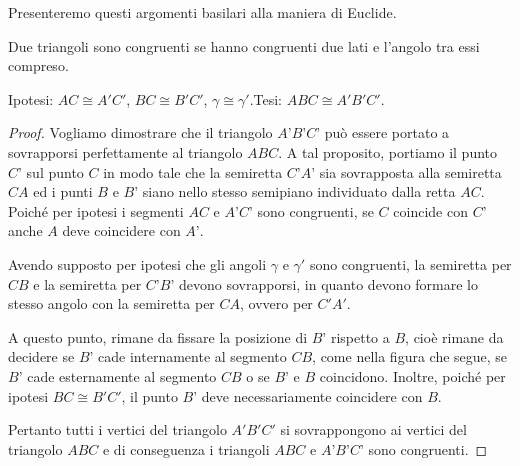 Presenteremo questi argomenti basilari alla maniera di Euclide.

\begin{teorema}
Due triangoli sono congruenti se hanno congruenti due lati e l'angolo 
tra essi compreso.
\end{teorema}


\begin{inaccessibleblock}
 \begin{figure}[htb]
\centering
\end{figure}
\end{inaccessibleblock}

\noindent Ipotesi: \(AC\cong A'C'\), \(BC\cong B'C'\), \(\gamma \cong 
\gamma'\).\tab Tesi:  \(ABC \cong A'B'C'\).

\begin{proof}
Vogliamo dimostrare che il triangolo \(A’B’C’\) può essere portato a 
sovrapporsi perfettamente al triangolo \(ABC\).
A tal proposito, portiamo il punto \(C’\) sul punto \(C\) in modo tale 
che la semiretta \(C’A’\) sia sovrapposta alla semiretta \(CA\) ed i punti 
\(B\) e \(B’\) siano nello stesso semipiano individuato dalla retta \(AC\).
Poiché per ipotesi i segmenti \(AC\) e \(A’C’\) sono congruenti, se \(C\) 
coincide con \(C’\) anche \(A\) deve coincidere con \(A’\).

Avendo supposto per ipotesi che gli angoli \(\gamma\) e \(\gamma'\) sono 
congruenti, la semiretta per \(CB\) e la semiretta per \(C’B’\) devono 
sovrapporsi, in quanto devono formare lo stesso angolo con la 
semiretta per \(CA\), ovvero per \(C'A'\).

A questo punto, rimane da fissare la posizione di \(B’\) rispetto a 
\(B\), cioè rimane da decidere se \(B’\) cade internamente al segmento 
\(CB\), come nella figura che segue, se \(B’\) cade esternamente al 
segmento \(CB\) o se \(B’\) e \(B\) coincidono.
Inoltre, poiché per ipotesi \(BC\cong B'C'\), il punto \(B’\) deve 
necessariamente coincidere con \(B\).

Pertanto tutti i vertici del triangolo \(A'B'C'\) si sovrappongono ai 
vertici del triangolo \(ABC\) e di conseguenza i triangoli \(ABC\) e 
\(A’B’C’\) sono congruenti.
\end{proof}

